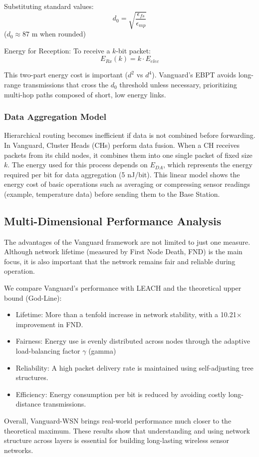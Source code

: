 \documentclass[conference]{IEEEtran}
\begin{document}
Substituting standard values:
\begin{equation}
d_0 = \sqrt{\frac{\epsilon_{fs}}{\epsilon_{mp}}}
\end{equation}
($d_0 \approx 87$ m when rounded)

Energy for Reception:
To receive a $k$-bit packet:
\begin{equation}
E_{Rx}(k) = k \cdot E_{elec}
\end{equation}

This two-part energy cost is important ($d^2$ vs $d^4$). Vanguard's EBPT avoids long-range transmissions that cross the $d_0$ threshold unless necessary, prioritizing multi-hop paths composed of short, low energy links.

\subsubsection{Data Aggregation Model}
Hierarchical routing becomes inefficient if data is not combined before forwarding. In Vanguard, Cluster Heads (CHs) perform data fusion. When a CH receives packets from its child nodes, it combines them into one single packet of fixed size $k$.
The energy used for this process depends on $E_{DA}$, which represents the energy required per bit for data aggregation (5 nJ/bit). This linear model shows the energy cost of basic operations such as averaging or compressing sensor readings (example, temperature data) before sending them to the Base Station.

\subsection{Multi-Dimensional Performance Analysis}
The advantages of the Vanguard framework are not limited to just one measure. Although network lifetime (measured by First Node Death, FND) is the main focus, it is also important that the network remains fair and reliable during operation.

We compare Vanguard’s performance with LEACH \cite{b1} and the theoretical upper bound (God-Line):
\begin{itemize}
    \item Lifetime: More than a tenfold increase in network stability, with a 10.21$\times$ improvement in FND.
    \item Fairness: Energy use is evenly distributed across nodes through the adaptive load-balancing factor $\gamma$ (gamma)
    \item Reliability: A high packet delivery rate is maintained using self-adjusting tree structures.
    \item Efficiency: Energy consumption per bit is reduced by avoiding costly long-distance transmissions.
\end{itemize}
Overall, Vanguard-WSN brings real-world performance much closer to the theoretical maximum. These results show that understanding and using network structure across layers is essential for building long-lasting wireless sensor networks.
\end{document}
